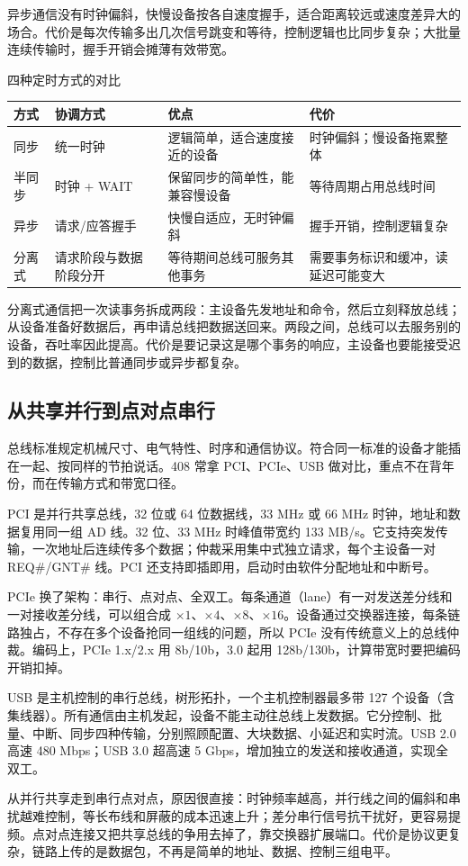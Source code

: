 异步通信没有时钟偏斜，快慢设备按各自速度握手，适合距离较远或速度差异大的场合。代价是每次传输多出几次信号跳变和等待，控制逻辑也比同步复杂；大批量连续传输时，握手开销会摊薄有效带宽。

\begin{tablebox}{四种定时方式的对比}
\centering
\small
\begin{tabularx}{\linewidth}{@{}l l X X@{}}
\toprule
方式 & 协调方式 & 优点 & 代价 \\
\midrule
同步 & 统一时钟 & 逻辑简单，适合速度接近的设备 & 时钟偏斜；慢设备拖累整体 \\
半同步 & 时钟 + WAIT & 保留同步的简单性，能兼容慢设备 & 等待周期占用总线时间 \\
异步 & 请求/应答握手 & 快慢自适应，无时钟偏斜 & 握手开销，控制逻辑复杂 \\
分离式 & 请求阶段与数据阶段分开 & 等待期间总线可服务其他事务 & 需要事务标识和缓冲，读延迟可能变大 \\
\bottomrule
\end{tabularx}
\end{tablebox}

分离式通信把一次读事务拆成两段：主设备先发地址和命令，然后立刻释放总线；从设备准备好数据后，再申请总线把数据送回来。两段之间，总线可以去服务别的设备，吞吐率因此提高。代价是要记录这是哪个事务的响应，主设备也要能接受迟到的数据，控制比普通同步或异步都复杂。

\subsection{从共享并行到点对点串行}

总线标准规定机械尺寸、电气特性、时序和通信协议。符合同一标准的设备才能插在一起、按同样的节拍说话。408 常拿 PCI、PCIe、USB 做对比，重点不在背年份，而在传输方式和带宽口径。

PCI 是并行共享总线，32 位或 64 位数据线，33 MHz 或 66 MHz 时钟，地址和数据复用同一组 AD 线。32 位、33 MHz 时峰值带宽约 133 MB/s。它支持突发传输，一次地址后连续传多个数据；仲裁采用集中式独立请求，每个主设备一对 REQ\#/GNT\# 线。PCI 还支持即插即用，启动时由软件分配地址和中断号。

PCIe 换了架构：串行、点对点、全双工。每条通道（lane）有一对发送差分线和一对接收差分线，可以组合成 $\times1$、$\times4$、$\times8$、$\times16$。设备通过交换器连接，每条链路独占，不存在多个设备抢同一组线的问题，所以 PCIe 没有传统意义上的总线仲裁。编码上，PCIe 1.x/2.x 用 8b/10b，3.0 起用 128b/130b，计算带宽时要把编码开销扣掉。

USB 是主机控制的串行总线，树形拓扑，一个主机控制器最多带 127 个设备（含集线器）。所有通信由主机发起，设备不能主动往总线上发数据。它分控制、批量、中断、同步四种传输，分别照顾配置、大块数据、小延迟和实时流。USB 2.0 高速 480 Mbps；USB 3.0 超高速 5 Gbps，增加独立的发送和接收通道，实现全双工。

从并行共享走到串行点对点，原因很直接：时钟频率越高，并行线之间的偏斜和串扰越难控制，等长布线和屏蔽的成本迅速上升；差分串行信号抗干扰好，更容易提频。点对点连接又把共享总线的争用去掉了，靠交换器扩展端口。代价是协议更复杂，链路上传的是数据包，不再是简单的地址、数据、控制三组电平。


